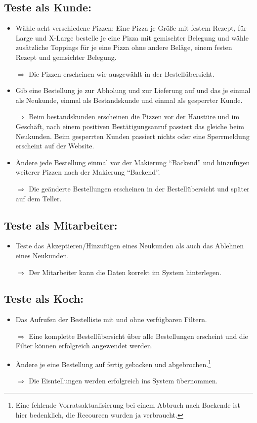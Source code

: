 \documentclass[a4paper]{report}
\begin{document}
\subsection*{Teste als Kunde:}
\begin{itemize}
 \item Wähle acht verschiedene Pizzen: Eine Pizza je Größe mit festem Rezept, für Large und X-Large bestelle je eine Pizza mit gemischter Belegung und wähle zusätzliche Toppings für je eine Pizza ohne andere Beläge, einem festen Rezept und gemsichter Belegung.  
 \item[$\Rightarrow$] Die Pizzen erscheinen wie ausgewählt in der Bestellübersicht.
 \item Gib eine Bestellung je zur Abholung und zur Lieferung auf und das je einmal als Neukunde, einmal als Bestandskunde und einmal als gesperrter Kunde.
 \item[$\Rightarrow$] Beim bestandskunden erscheinen die Pizzen vor der Haustüre und im Geschäft, nach einem positiven Bestätigungsanruf passiert das gleiche beim Neukunden. Beim gesperrten Kunden passiert nichts oder eine Sperrmeldung erscheint auf der Website.
 \item Ändere jede Bestellung einmal vor der Makierung ``Backend'' und hinzufügen weiterer Pizzen nach der Makierung ``Backend''.
 \item[$\Rightarrow$] Die geänderte Bestellungen erscheinen in der Bestellübersicht und später auf dem Teller.
\end{itemize}

\subsection*{Teste als Mitarbeiter:}
\begin{itemize}
 \item Teste das Akzeptieren/Hinzufügen eines Neukunden als auch das Ablehnen eines Neukunden. 
 \item[$\Rightarrow$] Der Mitarbeiter kann die Daten korrekt im System hinterlegen.
\end{itemize}

\subsection*{Teste als Koch:}
\begin{itemize}
 \item Das Aufrufen der Bestelliste mit und ohne verfügbaren Filtern.
 \item[$\Rightarrow$] Eine komplette Bestellübersicht über alle Bestellungen erscheint und die Filter können erfolgreich angewendet werden.
 \item Ändere je eine Bestellung auf fertig gebacken und abgebrochen.\footnote{Eine fehlende Vorratsaktualisierung bei einem Abbruch nach Backende ist hier bedenklich, die Recourcen wurden ja verbraucht.}
 \item[$\Rightarrow$] Die Eisntellungen werden erfolgreich ins System übernommen.
\end{itemize}
\end{document}
